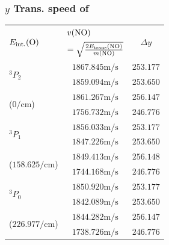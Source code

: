 \documentclass[aspectratio=1610,scheme=plain]{ctexbeamer}
\begin{document}
	\subsubsection{$y$ Trans. speed of }
	\begin{frame}{\insertsubsection}{\insertsubsubsection}
\begin{table}[htbp]  
	\centering  
	\tiny   
	\begin{tabular}{l|cc}    
		\toprule
		\multicolumn{1}{l}{\multirow{2}[1]{*}{$E_\text{int.}(\ce{O})$}} & \multicolumn{1}{l}{$v(\ce{NO}) $} & \multirow{2}[1]{*}{$\Delta y $} \\    
		\multicolumn{1}{l}{} & \multicolumn{1}{l}{$= \sqrt {  \frac{2E_\text{trans}(\ce{NO})}{m(\ce{NO})}   }$} &  \\    
		\midrule
		\multirow{2}[1]{*}{$^3 P_2$} & $1867.845 \unit{\meter \per \second}$ & $253.177$ \\          
		& $1859.094 \unit{\meter \per \second}$ & $253.650$ \\    
		\multirow{2}[1]{*}{($\num{0}\unit{\per \centi \meter}$)} & $1861.267 \unit{\meter \per \second}$ & $256.147$ \\          
		& $1756.732 \unit{\meter \per \second}$ & $246.776$ \\    
		\midrule    
		\multirow{2}[1]{*}{$^3 P_1$} & $1856.033 \unit{\meter \per \second}$ & $253.177$ \\          
		& $1847.226 \unit{\meter \per \second}$ & $253.650$ \\    
		\multirow{2}[1]{*}{($\num{158.625}\unit{\per \centi \meter}$)} & $1849.413 \unit{\meter \per \second}$ & $256.148$ \\          
		& $1744.168 \unit{\meter \per \second}$ & $246.776$ \\    
		\midrule    
		\multirow{2}[1]{*}{$^3 P_0$} & $1850.920 \unit{\meter \per \second}$ & $253.177$ \\          
		& $1842.089 \unit{\meter \per \second}$ & $253.650$ \\    
		\multirow{2}[1]{*}{($\num{226.977}\unit{\per \centi \meter}$)} & $1844.282 \unit{\meter \per \second}$ & $256.147$ \\          
		& $1738.726 \unit{\meter \per \second}$ & $246.776$ \\    		\bottomrule    
		\end{tabular}
	\end{table}%
\end{frame}
\end{document}
